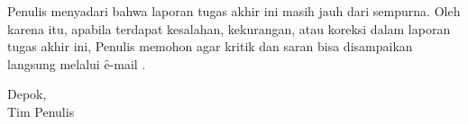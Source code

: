 Penulis menyadari bahwa laporan tugas akhir ini masih jauh dari sempurna. Oleh karena itu, apabila terdapat kesalahan, kekurangan, atau koreksi dalam laporan tugas akhir ini, Penulis memohon agar kritik dan saran bisa disampaikan langsung melalui \f{e-mail} .


\vspace*{0.1cm}
\begin{flushright}
Depok, \tanggalSiapSidang\\[0.1cm]
\ifx\blank\npmDua
	\vspace*{1.5cm}
	\penulisSatu
\else
	Tim Penulis
\fi

\end{flushright}
